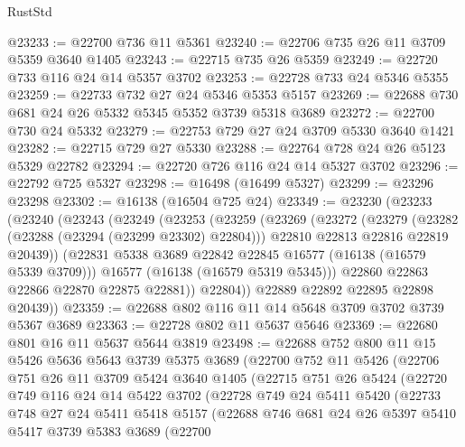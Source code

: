 \begin{lexlean}{RustStd}
\begin{coremodule}
@23233 := @22700 @736 @11 @5361
@23240 := @22706 @735 @26 @11 @3709 @5359 @3640 @1405
@23243 := @22715 @735 @26 @5359
@23249 := @22720 @733 @116 @24 @14 @5357 @3702
@23253 := @22728 @733 @24 @5346 @5355
@23259 := @22733 @732 @27 @24 @5346 @5353 @5157
@23269 := @22688 @730 @681 @24 @26 @5332 @5345 @5352 @3739 @5318 @3689
@23272 := @22700 @730 @24 @5332
@23279 := @22753 @729 @27 @24 @3709 @5330 @3640 @1421
@23282 := @22715 @729 @27 @5330
@23288 := @22764 @728 @24 @26 @5123 @5329 @22782
@23294 := @22720 @726 @116 @24 @14 @5327 @3702
@23296 := @22792 @725 @5327
@23298 := @16498 (@16499 @5327)
@23299 := @23296 @23298
@23302 := @16138 (@16504 @725 @24)
@23349 := @23230
    (@23233
      (@23240
        (@23243
          (@23249
            (@23253
              (@23259
                (@23269
                  (@23272
                    (@23279
                      (@23282 (@23288 (@23294 (@23299 @23302) @22804)))
                      @22810
                      @22813
                      @22816
                      @22819
                      @20439))
                  (@22831 @5338 @3689 @22842 @22845 @16577 (@16138 (@16579 @5339 @3709)))
                  @16577
                  (@16138 (@16579 @5319 @5345)))
                @22860
                @22863
                @22866
                @22870
                @22875
                @22881))
            @22804))
        @22889
        @22892
        @22895
        @22898
        @20439))
@23359 := @22688 @802 @116 @11 @14 @5648 @3709 @3702 @3739 @5367 @3689
@23363 := @22728 @802 @11 @5637 @5646
@23369 := @22680 @801 @16 @11 @5637 @5644 @3819
@23498 := @22688
    @752
    @800
    @11
    @15
    @5426
    @5636
    @5643
    @3739
    @5375
    @3689
    (@22700
      @752
      @11
      @5426
      (@22706
        @751
        @26
        @11
        @3709
        @5424
        @3640
        @1405
        (@22715
          @751
          @26
          @5424
          (@22720
            @749
            @116
            @24
            @14
            @5422
            @3702
            (@22728
              @749
              @24
              @5411
              @5420
              (@22733
                @748
                @27
                @24
                @5411
                @5418
                @5157
                (@22688
                  @746
                  @681
                  @24
                  @26
                  @5397
                  @5410
                  @5417
                  @3739
                  @5383
                  @3689
                  (@22700

\end{coremodule}
\end{lexlean}
